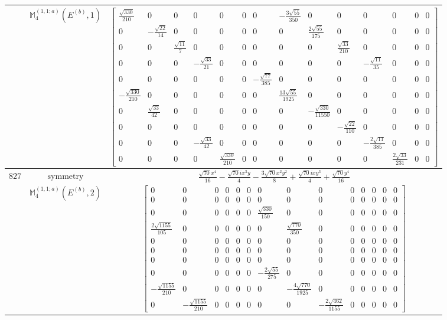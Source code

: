 \documentclass[fleqn,8pt,landscape]{jsarticle}
\begin{document}
\begin{longtable}{ccc}
$  $ & $ \mathbb{M}_{4}^{(1,1;a)}(E^{(b)},1) $ & $ \begin{bmatrix} \frac{\sqrt{330}}{210} & 0 & 0 & 0 & 0 & 0 & 0 & - \frac{3 \sqrt{55}}{350} & 0 & 0 & 0 & 0 & 0 & 0 \\ 0 & - \frac{\sqrt{22}}{14} & 0 & 0 & 0 & 0 & 0 & 0 & \frac{2 \sqrt{55}}{175} & 0 & 0 & 0 & 0 & 0 \\ 0 & 0 & \frac{\sqrt{11}}{7} & 0 & 0 & 0 & 0 & 0 & 0 & \frac{\sqrt{33}}{210} & 0 & 0 & 0 & 0 \\ 0 & 0 & 0 & - \frac{\sqrt{33}}{21} & 0 & 0 & 0 & 0 & 0 & 0 & - \frac{\sqrt{11}}{35} & 0 & 0 & 0 \\ 0 & 0 & 0 & 0 & 0 & 0 & - \frac{\sqrt{77}}{385} & 0 & 0 & 0 & 0 & 0 & 0 & 0 \\ - \frac{\sqrt{330}}{210} & 0 & 0 & 0 & 0 & 0 & 0 & \frac{13 \sqrt{55}}{1925} & 0 & 0 & 0 & 0 & 0 & 0 \\ 0 & \frac{\sqrt{33}}{42} & 0 & 0 & 0 & 0 & 0 & 0 & - \frac{\sqrt{330}}{11550} & 0 & 0 & 0 & 0 & 0 \\ 0 & 0 & 0 & 0 & 0 & 0 & 0 & 0 & 0 & - \frac{\sqrt{22}}{110} & 0 & 0 & 0 & 0 \\ 0 & 0 & 0 & - \frac{\sqrt{33}}{42} & 0 & 0 & 0 & 0 & 0 & 0 & - \frac{2 \sqrt{11}}{385} & 0 & 0 & 0 \\ 0 & 0 & 0 & 0 & \frac{\sqrt{330}}{210} & 0 & 0 & 0 & 0 & 0 & 0 & \frac{2 \sqrt{33}}{231} & 0 & 0 \end{bmatrix} $ \\ \hline
$ 827 $ & $ \text{symmetry} $ & $ \frac{\sqrt{70} x^{4}}{16} - \frac{\sqrt{70} i x^{3} y}{4} - \frac{3 \sqrt{70} x^{2} y^{2}}{8} + \frac{\sqrt{70} i x y^{3}}{4} + \frac{\sqrt{70} y^{4}}{16} $ \\
$  $ & $ \mathbb{M}_{4}^{(1,1;a)}(E^{(b)},2) $ & $ \begin{bmatrix} 0 & 0 & 0 & 0 & 0 & 0 & 0 & 0 & 0 & 0 & 0 & 0 & 0 & 0 \\ 0 & 0 & 0 & 0 & 0 & 0 & 0 & 0 & 0 & 0 & 0 & 0 & 0 & 0 \\ 0 & 0 & 0 & 0 & 0 & 0 & \frac{\sqrt{330}}{150} & 0 & 0 & 0 & 0 & 0 & 0 & 0 \\ \frac{2 \sqrt{1155}}{105} & 0 & 0 & 0 & 0 & 0 & 0 & \frac{\sqrt{770}}{350} & 0 & 0 & 0 & 0 & 0 & 0 \\ 0 & 0 & 0 & 0 & 0 & 0 & 0 & 0 & 0 & 0 & 0 & 0 & 0 & 0 \\ 0 & 0 & 0 & 0 & 0 & 0 & 0 & 0 & 0 & 0 & 0 & 0 & 0 & 0 \\ 0 & 0 & 0 & 0 & 0 & 0 & 0 & 0 & 0 & 0 & 0 & 0 & 0 & 0 \\ 0 & 0 & 0 & 0 & 0 & 0 & - \frac{2 \sqrt{55}}{275} & 0 & 0 & 0 & 0 & 0 & 0 & 0 \\ - \frac{\sqrt{1155}}{210} & 0 & 0 & 0 & 0 & 0 & 0 & - \frac{4 \sqrt{770}}{1925} & 0 & 0 & 0 & 0 & 0 & 0 \\ 0 & - \frac{\sqrt{1155}}{210} & 0 & 0 & 0 & 0 & 0 & 0 & - \frac{2 \sqrt{462}}{1155} & 0 & 0 & 0 & 0 & 0 \end{bmatrix} $ \\ \hline

\end{longtable}
\end{document}
